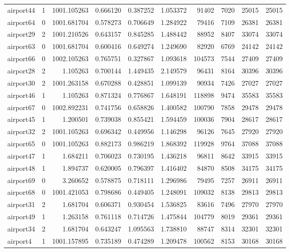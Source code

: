 \documentclass[../../../thesis.tex]{subfiles}
\begin{document}
\begin{longtable}{|l|r|r|r|r|r|r|r|r|r|}
airport44 & 1 & 1001.105263 & 0.666120 & 0.387252 & 1.053372 & 91402 & 7020 & 25015 & 25015 \\
airport64 & 0 & 1001.681704 & 0.578273 & 0.706649 & 1.284922 & 79416 & 7109 & 26381 & 26381 \\
airport29 & 2 & 1001.210526 & 0.643157 & 0.845285 & 1.488442 & 88952 & 8407 & 33074 & 33074 \\
airport63 & 0 & 1001.681704 & 0.600416 & 0.649274 & 1.249690 & 82920 & 6769 & 24142 & 24142 \\
airport66 & 0 & 1002.105263 & 0.765751 & 0.327867 & 1.093618 & 104573 & 7544 & 27409 & 27409 \\
airport28 & 2 & 1.105263 & 0.700144 & 1.449435 & 2.149579 & 96431 & 8164 & 30396 & 30396 \\
airport30 & 2 & 1001.263158 & 0.670288 & 0.428851 & 1.099139 & 90934 & 7426 & 27027 & 27027 \\
airport46 & 1 & 1.105263 & 0.871324 & 0.776867 & 1.648191 & 118898 & 9474 & 35583 & 35583 \\
airport67 & 0 & 1002.892231 & 0.741756 & 0.658826 & 1.400582 & 100790 & 7858 & 29478 & 29478 \\
airport45 & 1 & 1.200501 & 0.739038 & 0.855421 & 1.594459 & 100036 & 7904 & 28617 & 28617 \\
airport32 & 2 & 1001.105263 & 0.696342 & 0.449956 & 1.146298 & 96126 & 7645 & 27920 & 27920 \\
airport65 & 0 & 1001.105263 & 0.882173 & 0.986219 & 1.868392 & 119928 & 9764 & 37088 & 37088 \\
airport47 & 1 & 1.684211 & 0.706023 & 0.730195 & 1.436218 & 96811 & 8642 & 33915 & 33915 \\
airport48 & 1 & 1.894737 & 0.620005 & 0.796397 & 1.416402 & 84870 & 8508 & 34175 & 34175 \\
airport69 & 0 & 3.260652 & 0.578875 & 0.718111 & 1.296986 & 79495 & 7257 & 26911 & 26911 \\
airport68 & 0 & 1001.421053 & 0.798686 & 0.449405 & 1.248091 & 109032 & 8138 & 29813 & 29813 \\
airport31 & 2 & 1.681704 & 0.606371 & 0.930454 & 1.536825 & 83616 & 7496 & 27970 & 27970 \\
airport49 & 1 & 1.263158 & 0.761118 & 0.714726 & 1.475844 & 104779 & 8019 & 29361 & 29361 \\
airport34 & 2 & 1.681704 & 0.643247 & 1.095563 & 1.738810 & 88747 & 8314 & 32301 & 32301 \\
airport4 & 1 & 1001.157895 & 0.735189 & 0.474289 & 1.209478 & 100562 & 8153 & 30168 & 30168 \\

\end{longtable}
\end{document}
